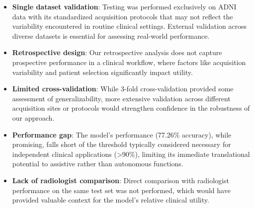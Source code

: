 \documentclass[12pt, a4paper]{article}
\begin{document}
\begin{itemize}
    \item \textbf{Single dataset validation}: Testing was performed exclusively on ADNI data with its standardized acquisition protocols that may not reflect the variability encountered in routine clinical settings. External validation across diverse datasets is essential for assessing real-world performance.
    
    \item \textbf{Retrospective design}: Our retrospective analysis does not capture prospective performance in a clinical workflow, where factors like acquisition variability and patient selection significantly impact utility.
    
    \item \textbf{Limited cross-validation}: While 3-fold cross-validation provided some assessment of generalizability, more extensive validation across different acquisition sites or protocols would strengthen confidence in the robustness of our approach.
    
    \item \textbf{Performance gap}: The model's performance (77.26\% accuracy), while promising, falls short of the threshold typically considered necessary for independent clinical applications (>90\%), limiting its immediate translational potential to assistive rather than autonomous functions.
    
    \item \textbf{Lack of radiologist comparison}: Direct comparison with radiologist performance on the same test set was not performed, which would have provided valuable context for the model's relative clinical utility.
\end{itemize}


    
\end{document}
